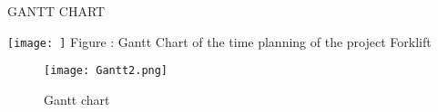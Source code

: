 \documentclass[../report.tex]{subfiles}
\begin{document}
    GANTT CHART

\texttt{[image: ]}
 Figure : Gantt Chart of the time planning of the project Forklift

 \begin{figure}[h!]
    \centering
    \texttt{[image: Gantt2.png]}
    \caption{Gantt chart}
 \end{figure}
  
\end{document}
